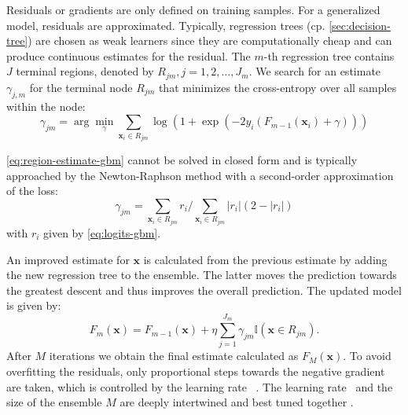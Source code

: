 Residuals or gradients are only defined on training samples. For a generalized model, residuals are approximated. Typically, regression trees (cp. \cref{sec:decision-tree}) are chosen as weak learners since they are computationally cheap and can produce continuous estimates for the residual. The $m$-th regression tree contains $J$ terminal regions, denoted by $R_{j m}, j=1,2, \ldots, J_{m}$. We search for an estimate $\gamma_{j,m}$ for the terminal node $R_{jm}$ that minimizes the cross-entropy over all samples within the node:
\begin{equation}
    \gamma_{j m}=\arg \min _\gamma \sum_{\mathbf{x}_i \in R_{j m}} \log \left(1+\exp \left(-2 y_i\left(F_{m-1}\left(\mathbf{x}_i\right)+\gamma\right)\right)\right)
    \label{eq:region-estimate-gbm}
\end{equation}

\cref{eq:region-estimate-gbm} cannot be solved in closed form and is typically approached by the Newton-Raphson method with a second-order approximation of the loss:
\begin{equation}
    \gamma_{j m}=\sum_{\mathbf{x}_i \in R_{j m}} r_i / \sum_{\mathbf{x}_i \in R_{j m}}\left|r_i\right|\left(2-\left|r_i\right|\right)
\end{equation}
with $r_i$ given by \cref{eq:logits-gbm}.

An improved estimate for $\mathbf{x}$ is calculated from the previous estimate by adding the new regression tree to the ensemble. The latter moves the prediction towards the greatest descent and thus improves the overall prediction. The updated model is given by:
\begin{equation}
    F_{m}(\mathbf{x})=F_{m-1}(\mathbf{x})+\eta \sum_{j=1}^{J_{m}} \gamma_{j m} \mathbb{I}\left(\mathbf{x} \in R_{j m}\right).
\end{equation}
After $M$ iterations we obtain the final estimate calculated as $F_{M}\left(\mathbf{x}\right)$. To avoid \gls{overfitting} the residuals, only proportional steps towards the negative gradient are taken, which is controlled by the learning rate \eta~\autocite[][1203]{friedmanGreedyFunctionApproximation2001}. The learning rate \eta~and the size of the ensemble $M$ are deeply intertwined and best tuned together \autocite[1203--1204][13]{friedmanGreedyFunctionApproximation2001}.

